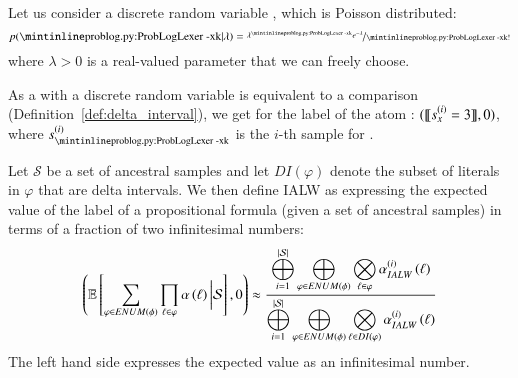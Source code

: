 \begin{example}
    Let us consider a discrete random variable , which is Poisson distributed: 
    $$
    p(\mathprobloginline{k}|\lambda)=\nicefrac{\lambda^\mathprobloginline{k} e^{-\lambda}}{\mathprobloginline{k}!}
    $$
    where $\lambda>0$ is a real-valued parameter that we can freely choose.

    As a  with a discrete random variable is equivalent to a \probloginline{=:=} comparison (\cf Definition~\ref{def:delta_interval}), we get for the label of the atom :
    $(\llbracket s_x^{(i)}=3\rrbracket, 0)$, where $s_\mathprobloginline{k}^{(i)}$ is the $i$-th sample for .  
\end{example}







\begin{definition}
\label{def:alw}
Let $\mathcal{S}$ be a set of ancestral samples and let $ DI(\varphi)$ denote the subset of literals in $\varphi$ that are delta intervals. We then define IALW as expressing the expected value of the label of a propositional formula (given a set of ancestral samples) in terms of a fraction of two infinitesimal numbers:
\begin{align}
    \left( \operatorname*{\mathbb{E}} \left[ \sum_{\varphi\in ENUM(\phi)} \prod_{\ell \in \varphi}  \alpha \left(\ell \right) \bigg| \mathcal{S} \right] ,0 \right)
    \approx
    \frac
    {\displaystyle \bigoplus_{i=1}^{\lvert \mathcal{S} \rvert}  \bigoplus_{\varphi\in ENUM(\phi)} \bigotimes_{\ell \in \varphi}  \alpha_{IALW}^{(i)} \left(\ell \right)}
    {\displaystyle \bigoplus_{i=1}^{\lvert \mathcal{S} \rvert} \bigoplus_{\varphi\in ENUM(\phi)} \bigotimes_{\ell \in  DI(\varphi)}  \alpha_{IALW}^{(i)} \left(\ell \right)  } \label{eq:ALW}
\end{align}
The left hand side expresses the expected value as an infinitesimal number.
\end{definition}

